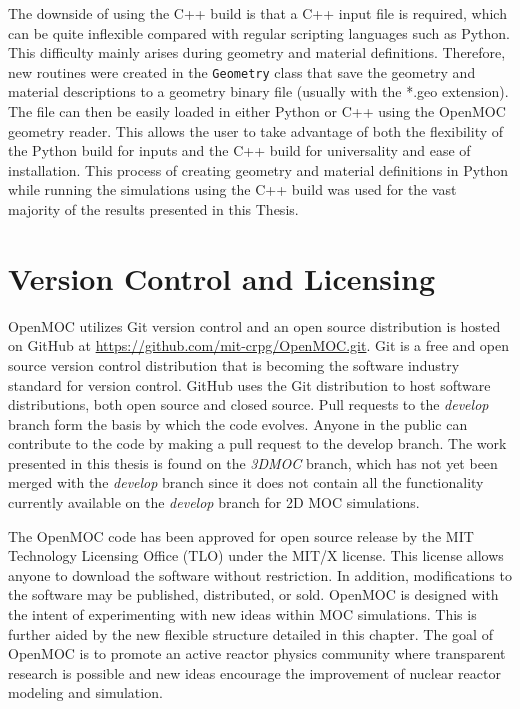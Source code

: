 The downside of using the C++ build is that a C++ input file is required, which can be quite inflexible compared with regular scripting languages such as Python. This difficulty mainly arises during geometry and material definitions. Therefore, new routines were created in the \texttt{Geometry} class that save the geometry and material descriptions to a geometry binary file (usually with the *.geo extension). The file can then be easily loaded in either Python or C++ using the OpenMOC geometry reader. This allows the user to take advantage of both the flexibility of the Python build for inputs and the C++ build for universality and ease of installation. This process of creating geometry and material definitions in Python while running the simulations using the C++ build was used for the vast majority of the results presented in this Thesis.



\section{Version Control and Licensing}
\label{sec:version-control}

OpenMOC utilizes Git version control and an open source distribution is hosted on GitHub at \url{https://github.com/mit-crpg/OpenMOC.git}. Git is a free and open source version control distribution that is becoming the software industry standard for version control. GitHub uses the Git distribution to host software distributions, both open source and closed source. Pull requests to the \textit{develop} branch form the basis by which the code evolves. Anyone in the public can contribute to the code by making a pull request to the develop branch. The work presented in this thesis is found on the \textit{3DMOC} branch, which has not yet been merged with the \textit{develop} branch since it does not contain all the functionality currently available on the \textit{develop} branch for 2D \ac{MOC} simulations.

The OpenMOC code has been approved for open source release by the MIT Technology Licensing Office (TLO) under the MIT/X license. This license allows anyone to download the software without restriction. In addition, modifications to the software may be published, distributed, or sold. OpenMOC is designed with the intent of experimenting with new ideas within \ac{MOC} simulations. This is further aided by the new flexible structure detailed in this chapter. The goal of OpenMOC is to promote an active reactor physics community where transparent research is possible and new ideas encourage the improvement of nuclear reactor modeling and simulation.

